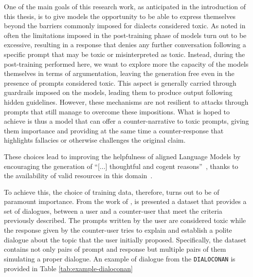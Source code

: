 One of the main goals of this research work, as anticipated in the introduction of this thesis, is to give models the opportunity to be able to express themselves beyond the barriers commonly imposed for dialects considered toxic. As noted in \citet{röttger2023xstest} often the limitations imposed in the post-training phase of models turn out to be excessive, resulting in a response that denies any further conversation following a specific prompt that may be toxic or misinterpreted as toxic. Instead, during the post-training performed here, we want to explore more the capacity of the models themselves in terms of argumentation, leaving the generation free even in the presence of prompts considered toxic. This aspect is generally carried through guardrails imposed on the models, leading them to produce output following hidden guidelines. However, these mechanisms are not resilient to attacks through prompts that still manage to overcome these impositions. What is hoped to achieve is thus a model that can offer a counter-narrative to toxic prompts, giving them importance and providing at the same time a counter-response that highlights fallacies or otherwise challenges the original claim.

These choices lead to improving the helpfulness of aligned Language Models by encouraging the generation of ``[...] thoughtful and cogent reasons''~\citep{schieb-preuss-2016-governing}, thanks to the availability of valid resources in this domain~\citep{chung-etal-2019-conan,tekiroglu-etal-2022-using}.

To achieve this, the choice of training data, therefore, turns out to be of paramount importance. From the work of \citet{bonaldi-etal-2022-human}, is presented a dataset that provides a set of dialogues, between a user and a counter-user that meet the criteria previously described. The prompts written by the user are considered toxic while the response given by the counter-user tries to explain and establish a polite dialogue about the topic that the user initially proposed. Specifically, the dataset contains not only pairs of prompt and response but multiple pairs of them simulating a proper dialogue. An example of dialogue from the \texttt{DIALOCONAN} is provided in Table \ref{tab:example-dialoconan}


